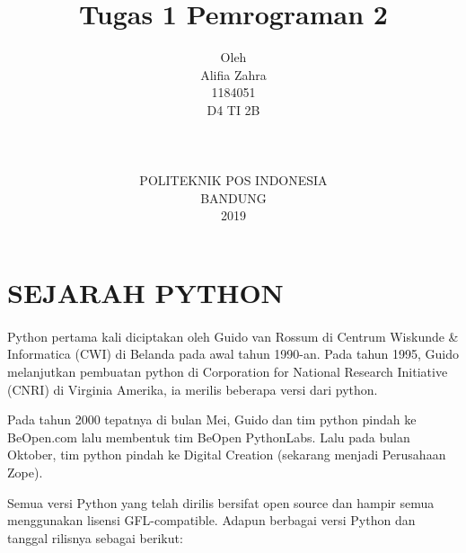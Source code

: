 \documentclass{article}
\title{Tugas 1 Pemrograman 2\\[1ex]}
\author{Oleh\\Alifia Zahra\\1184051\\D4 TI 2B\\\\\\\\POLITEKNIK POS INDONESIA\\BANDUNG\\2019}
\begin{document}
\maketitle

\newpage

\section{SEJARAH PYTHON}

        \paragraph{}Python pertama kali diciptakan oleh Guido van Rossum di  Centrum Wiskunde & Informatica (CWI) di Belanda pada awal tahun 1990-an. Pada tahun 1995, Guido melanjutkan pembuatan python di Corporation for National Research Initiative (CNRI) di Virginia Amerika, ia merilis beberapa versi dari python. 
        \par Pada tahun 2000 tepatnya di bulan Mei, Guido dan tim python pindah ke BeOpen.com lalu membentuk tim BeOpen PythonLabs. Lalu pada bulan Oktober, tim python pindah ke Digital Creation (sekarang menjadi Perusahaan Zope).
        \par Semua versi Python yang telah dirilis bersifat open source dan hampir semua menggunakan lisensi GFL-compatible. Adapun berbagai versi Python dan tanggal rilisnya sebagai berikut:
\end{document}
